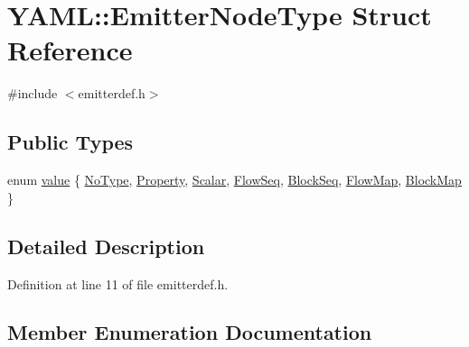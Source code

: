 \hypertarget{struct_y_a_m_l_1_1_emitter_node_type}{}\section{Y\+A\+ML\+::Emitter\+Node\+Type Struct Reference}
\label{struct_y_a_m_l_1_1_emitter_node_type}


{\ttfamily \#include $<$emitterdef.\+h$>$}

\subsection*{Public Types}
\begin{DoxyCompactItemize}
\item 
enum \mbox{\hyperlink{struct_y_a_m_l_1_1_emitter_node_type_ac42d64defd19943e78fd749faade2103}{value}} \{ \newline
\mbox{\hyperlink{struct_y_a_m_l_1_1_emitter_node_type_ac42d64defd19943e78fd749faade2103a92206f3fb315064474fe7c9560e923b5}{No\+Type}}, 
\mbox{\hyperlink{struct_y_a_m_l_1_1_emitter_node_type_ac42d64defd19943e78fd749faade2103ac4dc92ea144f1839458b23eac2d5ad90}{Property}}, 
\mbox{\hyperlink{struct_y_a_m_l_1_1_emitter_node_type_ac42d64defd19943e78fd749faade2103ade5ac97f97239e08774c2fb4d33dc859}{Scalar}}, 
\mbox{\hyperlink{struct_y_a_m_l_1_1_emitter_node_type_ac42d64defd19943e78fd749faade2103a6937702dc64cd082c7da72e8c5140569}{Flow\+Seq}}, 
\newline
\mbox{\hyperlink{struct_y_a_m_l_1_1_emitter_node_type_ac42d64defd19943e78fd749faade2103a66a3a5d45b16807288b70e21f3962a8c}{Block\+Seq}}, 
\mbox{\hyperlink{struct_y_a_m_l_1_1_emitter_node_type_ac42d64defd19943e78fd749faade2103adbb8c5a6cfd9015e6f732390f80b7d30}{Flow\+Map}}, 
\mbox{\hyperlink{struct_y_a_m_l_1_1_emitter_node_type_ac42d64defd19943e78fd749faade2103a1fc0038fc6e8b18a83ff9c1f6ec20fe0}{Block\+Map}}
 \}
\end{DoxyCompactItemize}


\subsection{Detailed Description}


Definition at line 11 of file emitterdef.\+h.



\subsection{Member Enumeration Documentation}
\mbox{\label{struct_y_a_m_l_1_1_emitter_node_type_ac42d64defd19943e78fd749faade2103}} 
